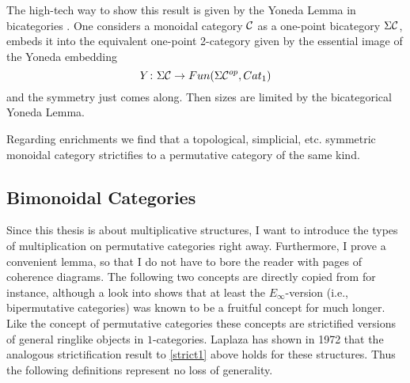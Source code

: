 The high-tech way to show this result is given by the Yoneda Lemma
in bicategories \cite[2.3]{Lei}. One considers a monoidal category 
$\mathcal{C}$ as a one-point bicategory $\Sigma\mathcal{C}$, embeds it into the equivalent 
one-point 2-category given by the essential image of the Yoneda 
embedding \[Y\colon \Sigma\mathcal{C} \rightarrow Fun(\Sigma\mathcal{C}^{op},Cat_1)\]
and the symmetry just comes along. Then sizes are limited by the
bicategorical Yoneda Lemma.

Regarding enrichments we find that a
topological, simplicial, etc. symmetric monoidal category strictifies to a 
permutative category of the same kind.

\subsection{Bimonoidal Categories} Since this thesis is about 
multiplicative structures, I want to introduce the types of 
multiplication on permutative categories right away. Furthermore, I 
prove a convenient lemma, so that I do not have to bore the 
reader with pages of coherence diagrams. The following two concepts 
are directly copied from \cite{EM} for instance, although a look into
\cite{MayEinf} shows that at least the $E_\infty$-version (i.e., 
bipermutative categories) was known to be a fruitful concept for much 
longer. Like the concept of permutative categories these concepts
are strictified versions of general ringlike objects in $1$-categories.
Laplaza has shown in 1972 \cite{Lap} that the analogous strictification
result to \ref{strict1} above holds for these structures. Thus the
following definitions represent no loss of generality.

{}

